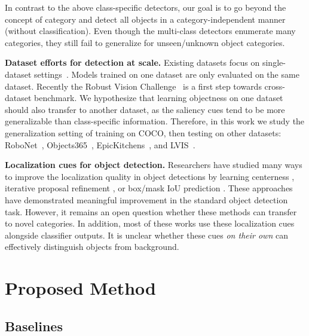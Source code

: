 \documentclass[10pt,twocolumn,letterpaper]{article}
\renewcommand{\paragraph}[1]{\vspace{1mm}\noindent\textbf{#1}}
\begin{document}
In contrast to the above class-specific detectors, our goal is to go beyond the concept of category and detect all objects in a category-independent manner (without classification). Even though the multi-class detectors enumerate many categories, they still fail to generalize for unseen/unknown object categories. 

\paragraph{Dataset efforts for detection at scale.} \quad
Existing datasets focus on single-dataset settings~\cite{Everingham15, gupta2019lvis, kuznetsova2018open,lin2014microsoft, shao2019objects365}.
Models trained on one dataset are only evaluated on the same dataset. Recently the Robust Vision Challenge~\cite{rvc2020} is a first step towards cross-dataset benchmark. We hypothesize that learning objectness on one dataset should also transfer to another dataset, as the saliency cues tend to be more generalizable than class-specific information. Therefore, in this work we study the generalization setting of training on COCO, then testing on other datasets: RoboNet~\cite{dasari2019robonet}, Objects365~\cite{shao2019objects365}, EpicKitchens~\cite{Damen2020Collection}, and LVIS~\cite{gupta2019lvis}.

\paragraph{Localization cues for object detection.} \quad
Researchers have studied many ways to improve the localization quality in object detections by learning centerness \cite{tian2019fcos}, iterative proposal refinement \cite{vu2019cascade}, or box/mask IoU prediction \cite{huang2019mask,jiang2018acquisition,tychsen2018improving}. These approaches have demonstrated meaningful improvement in the standard object detection task. However, it remains an open question whether these methods can transfer to novel categories. In addition, most of these works use these localization cues alongside classifier outputs. It is unclear whether these cues \textit{on their own} can effectively distinguish objects from background.


\section{Proposed Method}

\subsection{Baselines}
\end{document}

